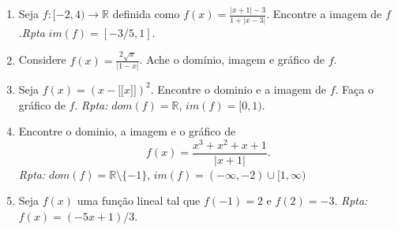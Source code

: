 \documentclass[latin,20pt]{article}
\begin{document}
    \begin{enumerate}
    \item Seja $f:[-2,4) \rightarrow \mathbb{R}$ definida como 
    $f(x)=\frac{|x+1|-3}{1+|x-3|}$. Encontre a imagem de $f$.{\it Rpta}
    $im(f)=[-3/5,1]$.     
    \item Considere $f(x)=\frac{2\sqrt{x}}{|1-x|}$. 
    Ache o domínio, imagem e gráfico de $f$.
    \item Seja $f(x)=(x-\lbrack\!\lbrack x \rbrack\!\rbrack)^2$. Encontre o dominio e a imagem de $f$. Faça o gráfico de $f$. 
    {\it Rpta:} $dom(f)=\mathbb{R}$, $im(f)=[0,1)$.
    \item Encontre o dominio, a imagem e o gráfico de 
    $$f(x)=\frac{x^3+x^2+x+1}{|x+1|}.$$
    {\it Rpta: } $dom(f)=\mathbb{R}\setminus\{-1\}$, 
    $im(f)=(-\infty, -2)\cup [1,\infty)$
    \item Seja $f(x)$ uma função lineal tal que $f(-1)=2$ e $f(2)=-3$. 
    {\it Rpta: } $f(x)=(-5x+1)/3$.
    \end{enumerate}
\end{document}
